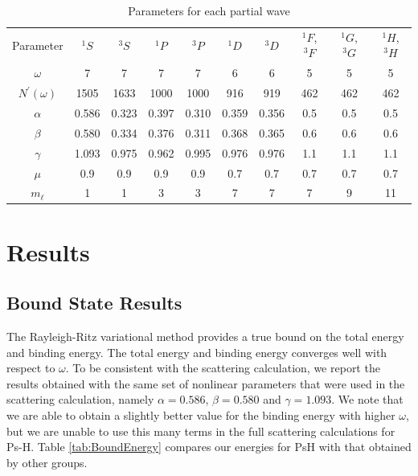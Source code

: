 \documentclass[preprint,showpacs,preprintnumbers,amsmath,amssymb]{revtex4}
\begin{document}
\begin{table}[H]
  \centering
	\begin{ruledtabular}
    \begin{tabular}{cccccccccc}
    Parameter & $^1S$ & $^3S$ & $^1P$ & $^3P$ & $^1D$ & $^3D$ & $^1F$, $^3F$ & $^1G$, $^3G$ & $^1H$, $^3H$ \\
    \colrule
	$\omega$           & 7     & 7     & 7     & 7     & 6     & 6     & 5    & 5   & 5 \\
	$N^\prime(\omega)$ & 1505  & 1633  & 1000  & 1000  & 916   & 919   & 462  & 462 & 462 \\
	$\alpha$           & 0.586 & 0.323 & 0.397 & 0.310 & 0.359 & 0.356 & 0.5  & 0.5 & 0.5 \\
	$\beta$            & 0.580 & 0.334 & 0.376 & 0.311 & 0.368 & 0.365 & 0.6  & 0.6 & 0.6 \\
	$\gamma$           & 1.093 & 0.975 & 0.962 & 0.995 & 0.976 & 0.976 & 1.1  & 1.1 & 1.1 \\
	$\mu$              & 0.9   & 0.9   & 0.9   & 0.9   & 0.7   & 0.7   & 0.7  & 0.7 & 0.7 \\
	$m_\ell$           & 1     & 1     & 3     & 3     & 7     & 7     & 7    & 9   & 11 \\
    \end{tabular}
  \end{ruledtabular}
  \caption{Parameters for each partial wave}
  \label{tab:Nonlinear}
\end{table}





\section{Results}
\label{sec:Results}


\subsection{Bound State Results}

The Rayleigh-Ritz variational method provides a true bound on the total energy and binding energy. The total energy and binding energy converges well with respect to $\omega$. To be consistent with the scattering calculation, we report the results obtained with the same set of nonlinear parameters that were used in the scattering calculation, namely $\alpha = 0.586$, $\beta = 0.580$ and $\gamma = 1.093$. We note that we are able to obtain a slightly better value for the binding energy with higher $\omega$, but we are unable to use this many terms in the full scattering calculations for Ps-H. Table \ref{tab:BoundEnergy} compares our energies for PsH with that obtained by other groups.
\end{document}
